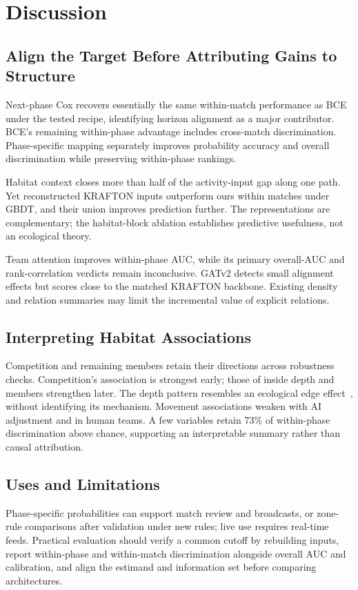 \documentclass[sigconf,anonymous,nonacm]{acmart}
\begin{document}
\section{Discussion}
\label{sec:discussion}
\subsection{Align the Target Before Attributing Gains to Structure}
\label{sec:discussion:drivers}
Next-phase Cox recovers essentially the same within-match performance as BCE under the tested recipe, identifying horizon alignment as a major contributor. BCE's remaining within-phase advantage includes cross-match discrimination. Phase-specific mapping separately improves probability accuracy and overall discrimination while preserving within-phase rankings.

Habitat context closes more than half of the activity-input gap along one path. Yet reconstructed KRAFTON inputs outperform ours within matches under GBDT, and their union improves prediction further. The representations are complementary; the habitat-block ablation establishes predictive usefulness, not an ecological theory.

Team attention improves within-phase AUC, while its primary overall-AUC and rank-correlation verdicts remain inconclusive. GATv2 detects small alignment effects but scores close to the matched KRAFTON backbone. Existing density and relation summaries may limit the incremental value of explicit relations.

\subsection{Interpreting Habitat Associations}
Competition and remaining members retain their directions across robustness checks. Competition's association is strongest early; those of inside depth and members strengthen later. The depth pattern resembles an ecological edge effect~\cite{Ries04}, without identifying its mechanism. Movement associations weaken with AI adjustment and in human teams. A few variables retain 73\% of within-phase discrimination above chance, supporting an interpretable summary rather than causal attribution.

\subsection{Uses and Limitations}
\label{sec:discussion:limits}
Phase-specific probabilities can support match review and broadcasts, or zone-rule comparisons after validation under new rules; live use requires real-time feeds. Practical evaluation should verify a common cutoff by rebuilding inputs, report within-phase and within-match discrimination alongside overall AUC and calibration, and align the estimand and information set before comparing architectures.
\end{document}
